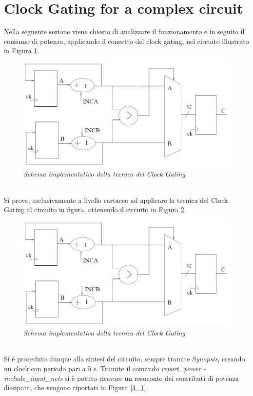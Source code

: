 {\section{Clock Gating for a complex circuit}
Nella seguente sezione viene chiesto di analizzare il funzionamento e in seguito il consumo di potenza, applicando il concetto del clock gating, nel circuito illustrato in Figura \ref{circuito_3_2}.\\
\begin{figure}[!htb]
	\centering
	\includegraphics[scale=0.8]{immagini/circuito_3_2}
	\caption{\textit{Schema implementativo della tecnica del Clock Gating}}
	\label{circuito_3_2}
\end{figure}
\\
Si prova, esclusivamente a livello cartaceo ad applicare la tecnica del Clock Gating al circuito in figura, ottenendo il circuito in Figura \ref{circuito_3_3}.\\
\begin{figure}[!htb]
	\centering
	\includegraphics[scale=0.8]{immagini/circuito_3_2}
	\caption{\textit{Schema implementativo della tecnica del Clock Gating}}
	\label{circuito_3_3}
\end{figure}
\\
Si è proceduto dunque alla sintesi del circuito, sempre tramite \textit{Synopsis}, creando un clock con periodo pari a 5 s. Tramite il comando \textit{report\_power -include\_input\_nets} si è potuto ricavare un resoconto dei contributi di potenza dissipata, che vengono riportati in Figura \ref{3_1}. \\
}
